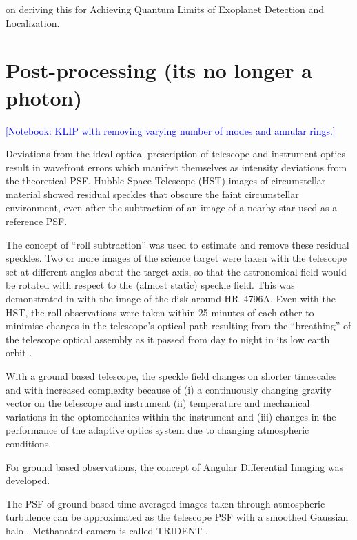 \documentclass[letterpaper]{ar-1col}
\newcommand{\notebooksuggestion}[1]{\textcolor{blue}{[Notebook: #1]}}
\begin{document}
\citet{Desai23} on deriving this for Achieving Quantum Limits of Exoplanet Detection and Localization.

\lipsum[2-4]

\section{Post-processing (its no longer a photon)}

\notebooksuggestion{KLIP with removing varying number of modes and annular rings.}

Deviations from the ideal optical prescription of telescope and instrument optics result in wavefront errors which manifest themselves as intensity deviations from the theoretical PSF.
%
Hubble Space Telescope (HST) images of circumstellar material showed residual speckles that obscure the faint circumstellar environment, even after the subtraction of an image of a nearby star used as a reference PSF.

The concept of ``roll subtraction''  \citep{Schneider98} was used to estimate and remove these residual speckles.
%
Two or more images of the science target were taken with the telescope set at different angles about the target axis, so that the astronomical field would be rotated with respect to the (almost static) speckle field.
%
This was demonstrated in \citet{Schneider99} with the image of the disk around HR~4796A.
%
Even with the HST, the roll observations were taken within 25 minutes of each other to minimise changes in the telescope's optical path resulting from the ``breathing'' of the telescope optical assembly as it passed from day to night in its low earth orbit \citep{Bely93}.

With a ground based telescope, the speckle field changes on shorter timescales and with increased complexity because of (i) a continuously changing gravity vector on the telescope and instrument (ii) temperature and mechanical variations in the optomechanics within the instrument and (iii) changes in the performance of the adaptive optics system due to changing atmospheric conditions.

For ground based observations, the concept of Angular Differential Imaging \citep[ADI; ][]{Marois06} was developed.

The PSF of ground based time averaged images taken through atmospheric turbulence can be approximated as the telescope PSF with a smoothed Gaussian halo \citep{Marois00}.
%
Methanated camera is called TRIDENT \citep{Marois05}.
\end{document}
